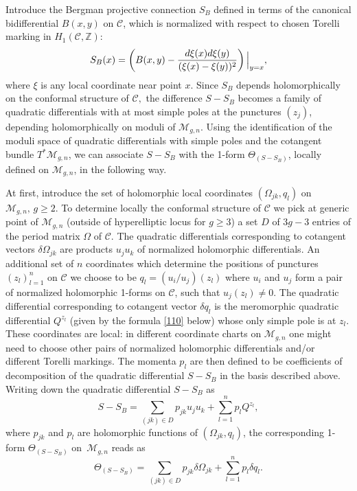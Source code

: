 \documentclass[10pt,a4paper]{article}
\numberwithin{equation}{section}
\theoremstyle{definition}
\newcommand{\Z}{\mathbb{Z}}
\begin{document}
Introduce the Bergman projective connection $S_B$ defined in terms of the canonical bidifferential $B(x,y)$ on $\mathcal{C}$, which is normalized with respect to chosen Torelli marking in $H_1(\mathcal{C},\Z)$:%
\begin{equation}\label{12}
 S_B(x)=\left(B(x,y)-\frac{{\rm d}\xi(x) {\rm d}\xi(y)}{(\xi(x)-\xi(y))^2}\right)\Big|_{y=x},
\end{equation}
where $\xi$ is any local coordinate near point $x.$ Since $S_B$ depends holomorphically on the conformal structure of $\mathcal{C},$ the difference $S-S_B$ becomes
a family of quadratic differentials with at most simple poles at the punctures $(z_j)$, depending holomorphically on moduli of $\mathcal{M}_{g,n}.$ Using the identification of the moduli space of quadratic differentials with simple poles and the cotangent bundle $T^*\mathcal{M}_{g,n}$, we can associate $S-S_B$ with the 1-form $\Theta_{(S-S_B)}$, locally defined on $\mathcal{M}_{g,n}$, in the following way.

At first, introduce the set of holomorphic local coordinates $(\Omega_{jk}, q_l)$ on $\mathcal{M}_{g,n}, \, g \geq 2$. To determine locally the
conformal structure of $\mathcal{C}$ we pick at generic point of $\mathcal{M}_{g,n}$ (outside of hyperelliptic locus for $g \geq 3$) a set $D$ of $3g-3$ entries of the
period matrix $\Omega$ of $\mathcal{C}.$ The quadratic differentials corresponding to cotangent vectors $\delta \Omega_{jk} $ are products $u_j u_k$ of normalized
holomorphic differentials. An additional set of $n$ coordinates which determine the positions of punctures $(z_l)^n_{l=1} $
on $\mathcal{C}$ we choose to be $q_l = (u_i/u_j )(z_l)$ where $u_i$ and $u_j$ form a pair of normalized holomorphic 1-forms on
$\mathcal{C}$, such that $u_j(z_l) \neq 0$. The quadratic differential corresponding to cotangent vector $\delta q_l$ is the meromorphic quadratic
differential $Q^{z_l}$ (given by the formula \eqref{110} below) whose only simple pole is at $z_l$. These coordinates are local: in different coordinate charts on
$\mathcal{M}_{g,n}$ one might need to choose other pairs of normalized holomorphic differentials and/or different Torelli
markings. The momenta $p_l$ are then defined
to be coefficients of decomposition of the quadratic differential $S-S_B$ in the
basis described above.
Writing down the quadratic differential $S-S_B$ as
\begin{equation*}
S-S_B=\sum_{(jk) \in D}p_{jk} u_j u_k+ \sum^n_{l=1} p_l Q^{z_l},
\end{equation*}
where $p_{jk}$ and $p_l$ are holomorphic functions of $(\Omega_{jk},q_l)$, the corresponding 1-form $\Theta_{(S-S_B)}$ on~$\mathcal{M}_{g,n}$ reads as
\begin{equation}\label{form}\Theta_{(S-S_B)}=\sum_{(jk) \in D}p_{jk} \delta \Omega_{jk}+ \sum^n_{l=1} p_l \delta q_l.\end{equation}
\end{document}
